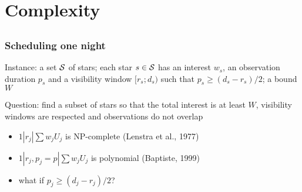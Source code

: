 \documentclass[colors]{beamer}
\begin{document}
\begin{frame}[t]
  \vfill
  \tableofcontents[sectionstyle=show,subsectionstyle=show/show/show]%
\end{frame}


\section{Complexity}
\subsection{}%

\begin{frame}
  \frametitle{Scheduling one night}
  
  Instance: a set $\cal S$ of stars; each star $s\in\cal S$ has an
  interest $w_s$, an observation duration $p_s$ and a visibility
  window $[r_s;d_s)$ \alert{such that $p_s\ge (d_s-r_s)/2$}; a bound
  $W$

  Question: find a subset of stars so that the total interest is at
  least $W$, visibility windows are respected and observations do not
  overlap

  \vfill

  \begin{itemize}
  \item<2-> $1|r_j|\sum w_jU_j$ is NP-complete (Lenstra et al., 1977)
  \item<3-> $1|r_j,p_j=p|\sum w_jU_j$ is polynomial (Baptiste, 1999)
  \item<4-> what if $p_j\ge (d_j-r_j)/2$?
  \end{itemize}

  \vfill
  

\end{frame}
\end{document}
